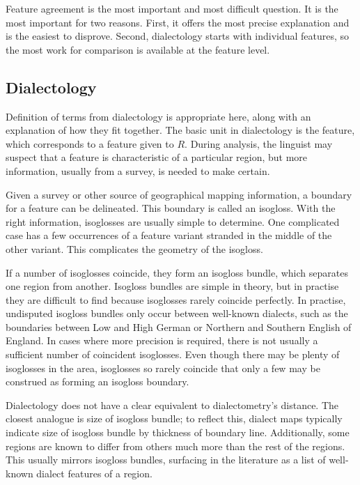 Feature agreement is the most important and most difficult
question. It is the most important for two reasons. First, it offers
the most precise explanation and is the easiest to disprove.
Second,
dialectology starts with individual features, so the most work for
comparison is available at the feature level.

\subsection{Dialectology}

Definition of terms from dialectology is appropriate here, along with
an explanation of how they fit together. The basic unit in
dialectology is the feature, which corresponds to a feature given to
$R$. During analysis, the linguist may suspect that a feature is
characteristic of a particular region, but more information, usually
from a survey, is needed to make certain.

Given a survey or other source of geographical mapping information, a
boundary for a feature can be delineated. This boundary is called an
isogloss. With the right information, isoglosses are usually simple to
determine. One complicated case has a few occurrences of a feature
variant stranded in the middle of the other variant. This complicates
the geometry of the isogloss.

If a number of isoglosses coincide, they form an isogloss bundle,
which separates one region from another. Isogloss bundles are simple
in theory, but in practise they are difficult to find because
isoglosses rarely coincide perfectly. In practise, undisputed isogloss
bundles only occur between well-known dialects, such as the
boundaries between Low and High German or Northern and Southern
English of England. In cases where more precision is required, there
is not usually a sufficient number of coincident isoglosses. Even
though there may be plenty of isoglosses in the area, isoglosses so
rarely coincide that only a few may be construed as forming an
isogloss boundary.

Dialectology does not have a clear equivalent to dialectometry's
distance. The closest analogue is size of isogloss bundle; to reflect
this, dialect maps typically indicate size of isogloss bundle by
thickness of boundary line. Additionally, some regions are known to differ from
others much more than the rest of the regions. This usually mirrors
isogloss bundles, surfacing in the literature as a list of well-known
dialect features of a region.


